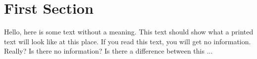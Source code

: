 \documentclass{article}
\begin{document}
\section{First Section}

Hello,  here  is  some  text  without  a  meaning.   This
text  should  show  what  a printed text will look like at
this place.  If you read this text, you will get no information.
Really?  Is there no information?  Is there a difference between
this ...
\end{document}
